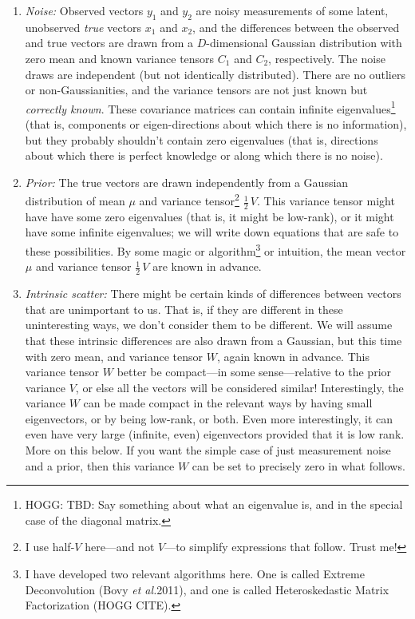 \documentclass[12pt,letterpaper]{article}
\newcommand{\foreign}[1]{\textsl{#1}}
\newcommand{\etal}{\foreign{et al.}}
\begin{document}
\begin{enumerate}\itemsep0ex
\item \emph{Noise:} Observed vectors $y_1$ and $y_2$ are noisy
  measurements of some latent, unobserved \emph{true} vectors $x_1$
  and $x_2$, and the differences between the observed and true vectors
  are drawn from a $D$-dimensional Gaussian distribution with zero
  mean and known variance tensors $C_1$ and $C_2$, respectively. The
  noise draws are independent (but not identically distributed). There
  are no outliers or non-Gaussianities, and the variance tensors are
  not just known but \emph{correctly known}. These covariance matrices can contain
  infinite eigenvalues\footnote{HOGG: TBD: Say something about what an eigenvalue is,
    and in the special case of the diagonal matrix.} (that is,
  components or eigen-directions about which there is no information),
  but they probably shouldn't contain zero eigenvalues (that is,
  directions about which there is perfect knowledge or along which there is no noise).
\item \emph{Prior:} The true vectors are drawn independently from a
  Gaussian distribution of mean $\mu$ and variance tensor\footnote{%
    I use half-$V$ here---and not $V$---to simplify expressions that follow. Trust me!}
  $\frac{1}{2}\,V$. This variance tensor might have have some zero
  eigenvalues (that is, it might be low-rank), or it might have some
  infinite eigenvalues; we will write down equations that are safe to
  these possibilities. By some magic or algorithm\footnote{I have
    developed two relevant algorithms here. One is called Extreme
    Deconvolution (Bovy \etal 2011), and one is called Heteroskedastic
    Matrix Factorization (HOGG CITE).} or intuition, the mean vector
  $\mu$ and variance tensor $\frac{1}{2}\,V$ are known in advance.
\item \emph{Intrinsic scatter:} There might be certain kinds of differences
  between vectors that are unimportant to us. That is, if they are
  different in these uninteresting ways, we don't consider them to be
  different. We will assume that these intrinsic differences are also
  drawn from a Gaussian, but this time with zero mean, and variance
  tensor $W$, again known in advance. This variance tensor $W$ better
  be compact---in some sense---relative to the prior variance $V$, or
  else all the vectors will be considered similar! Interestingly, the
  variance $W$ can be made compact in the relevant ways by having
  small eigenvectors, or by being low-rank, or both. Even more
  interestingly, it can even have very large (infinite, even)
  eigenvectors provided that it is low rank. More on this below.
  If you want the simple case of just measurement noise and a prior,
  then this variance $W$ can be set to precisely zero in what follows.
\end{enumerate}
\end{document}
